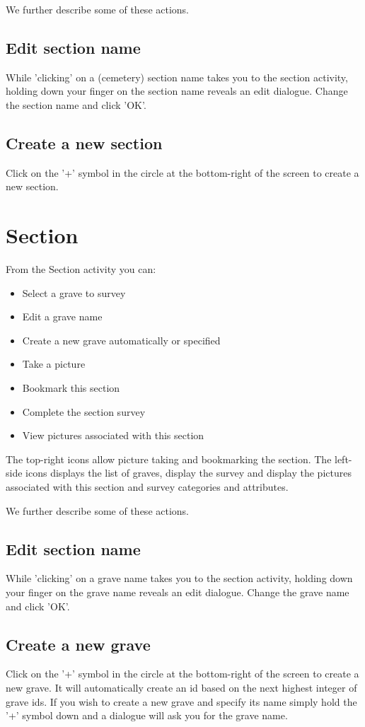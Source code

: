 \documentclass{scrreprt}
\begin{document}
We further describe some of these actions.

\subsection{Edit section name}
While 'clicking' on a (cemetery) section name takes you to the section activity, holding down  your finger on the section name reveals an edit dialogue. Change the section name and click 'OK'.

\subsection{Create a new section}
Click on the '+' symbol in the circle at the bottom-right of the screen to create a new section.

\section{Section}
From the Section activity you can:
\begin{itemize}
\item Select a grave to survey
\item Edit a grave name
\item Create a new grave automatically or specified
\item Take a picture
\item Bookmark this section
\item Complete the section survey
\item View pictures associated with this section
\end{itemize}

The top-right icons allow picture taking and bookmarking the section. The left-side icons displays the list of graves, display the survey and display the pictures associated with this section and survey categories and attributes.

We further describe some of these actions.

\subsection{Edit section name}
While 'clicking' on a grave name takes you to the section activity, holding down  your finger on the grave name reveals an edit dialogue. Change the grave name and click 'OK'.

\subsection{Create a new grave}
Click on the '+' symbol in the circle at the bottom-right of the screen to create a new grave. It will automatically create an id based on the next highest integer of grave ids. If you wish to create a new grave and specify its name simply hold the '+' symbol down and a dialogue will ask you for the grave name.
\end{document}
